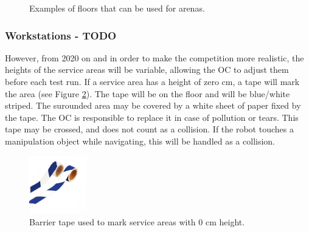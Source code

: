 \begin{figure} [h!]
\begin{center}
 \hspace{0.1cm}
 \hspace{0.1cm}
\end{center}
\caption{Examples of floors that can be used for \RCAW arenas.}
\label{fig:example_floors}
\end{figure}



\subsubsection{Workstations - TODO}

However, from 2020 on and in order to make the competition more realistic, the heights of the service areas will be variable, allowing the OC to adjust them before each test run.
If a service area has a height of zero cm, a tape will mark the area (see Figure \ref{fig:barrier_tape_0cm}).
The tape will be on the floor and will be blue/white striped.
The surounded area may be covered by a white sheet of paper fixed by the tape.
The OC is responsible to replace it in case of pollution or tears.
This tape may be crossed, and does not count as a collision.
If the robot touches a manipulation object while navigating, this will be handled as a collision.

\begin{figure} [h!]
\begin{center}
\includegraphics[height = 2.5cm]{./images/barrier_tape_0cm_area.jpg}
\end{center}
\caption{Barrier tape used to mark service areas with 0 cm height.}
\label{fig:barrier_tape_0cm}
\end{figure}

